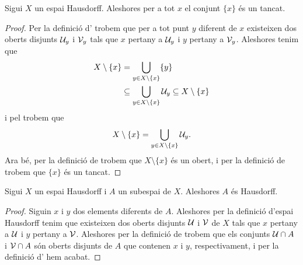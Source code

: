 \documentclass[../Apunts.tex]{subfiles}
\begin{document}
	\begin{proposition}
		\label{prop:els punts en un Hausdorff són tancats}
		Sigui \(X\) un espai Hausdorff. Aleshores per a tot \(x\) el conjunt \(\{x\}\) és un tancat.
		\begin{proof}
			Per la definició d' trobem que per a tot punt \(y\) diferent de \(x\) existeixen dos oberts disjunts \(\mathcal{U}_{y}\) i \(\mathcal{V}_{y}\) tals que \(x\) pertany a \(\mathcal{U}_{y}\) i \(y\) pertany a \(\mathcal{V}_{y}\). Aleshores tenim que
			\begin{align*}
				X\setminus\{x\}&=\bigcup_{y\in X\setminus\{x\}}\{y\} \\
				&\subseteq\bigcup_{y\in X\setminus\{x\}}\mathcal{U}_{y}\subseteq X\setminus\{x\}
			\end{align*}
			i pel  trobem que
			\[X\setminus\{x\}=\bigcup_{y\in X\setminus\{x\}}\mathcal{U}_{y}.\]
			Ara bé, per la definició de  trobem que \(X\setminus\{x\}\) és un obert, i per la definició de  trobem que \(\{x\}\) és un tancat.
		\end{proof}
	\end{proposition}
	\begin{proposition}
		\label{prop:els subespais d'un Hausdorff són Hausdorff}
		Sigui \(X\) un espai Hausdorff i \(A\) un subespai de \(X\). Aleshores \(A\) és Hausdorff.
		\begin{proof}
			Siguin \(x\) i \(y\) dos elements diferents de \(A\). Aleshores per la definició d'espai Hausdorff tenim que existeixen dos oberts disjunts \(\mathcal{U}\) i \(\mathcal{V}\) de \(X\) tals que \(x\) pertany a \(\mathcal{U}\) i \(y\) pertany a \(\mathcal{V}\). Aleshores per la definició de  trobem que els conjunts \(\mathcal{U}\cap A\) i \(\mathcal{V}\cap A\) són oberts disjunts de \(A\) que contenen \(x\) i \(y\), respectivament, i per la definició d' hem acabat.
		\end{proof}
	\end{proposition}
\end{document}
